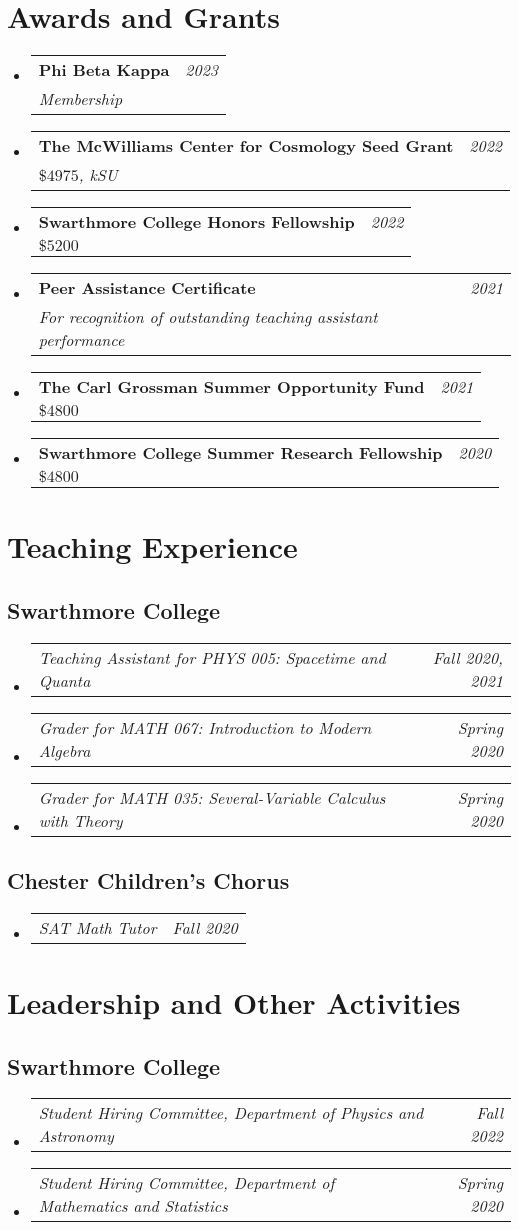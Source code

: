 \documentclass[letterpaper,11pt]{article}
\makeatletter
\newcommand{\resumeSubSubheading}[2]{
    \vspace{-8pt}\item
    \begin{tabular*}{0.97\textwidth}{l@{\extracolsep{\fill}}r}
      \textit{\small#1} & \textit{\small #2} \\
    \end{tabular*}\vspace{-10pt}
}
\newcommand{\AwardHeading}[4]{
    \vspace{-2pt}\item
    \begin{tabular*}{0.97\textwidth}{l@{\extracolsep{\fill}}r}
      \textbf{#1} & \textit{\small #2} \\
      \textit{#3} & \textit{#4}
    \end{tabular*}\vspace{-4pt}
}
\newcommand{\resumeSubHeadingListStart}{\begin{itemize}[leftmargin=0.15in, label={}]}
\newcommand{\resumeSubHeadingListEnd}{\end{itemize}}
\makeatother
\begin{document}
\section{Awards and Grants}
\vspace{3pt}
  \resumeSubHeadingListStart
    \AwardHeading{Phi Beta Kappa}{2023}{Membership}{}
    \AwardHeading{The McWilliams Center for Cosmology Seed Grant}{2022}{$\$4975$, {\normalfont 250 kSU}}{}
    \AwardHeading{Swarthmore College Honors Fellowship}{2022}{$\$5200$}{}
    \AwardHeading{Peer Assistance Certificate}{2021}{For recognition of outstanding teaching assistant performance}{}
    \AwardHeading{The Carl Grossman Summer Opportunity Fund }{2021}{$\$4800$}{}
    \AwardHeading{Swarthmore College Summer Research Fellowship}{2020}{$\$4800$}{}
  \resumeSubHeadingListEnd

\section{Teaching Experience}
  \vspace{3pt}
\subsection*{Swarthmore College}
\resumeSubHeadingListStart
\resumeSubSubheading{Teaching Assistant for PHYS 005: Spacetime and Quanta}{Fall 2020, 2021}
\resumeSubSubheading{Grader for MATH 067: Introduction to Modern Algebra}{Spring 2020}
\resumeSubSubheading{Grader for MATH 035: Several-Variable Calculus with Theory}{Spring 2020}
\resumeSubHeadingListEnd
\subsection*{Chester Children's Chorus}
\resumeSubHeadingListStart
\resumeSubSubheading{SAT Math Tutor}{Fall 2020}
\resumeSubHeadingListEnd
\vspace{1pt}
\section{Leadership and Other Activities}
  \vspace{3pt}
\subsection*{Swarthmore College}
\resumeSubHeadingListStart
\resumeSubSubheading{Student Hiring Committee, Department of Physics and Astronomy}{Fall 2022}
\resumeSubSubheading{Student Hiring Committee, Department of Mathematics and Statistics}{Spring 2020}
\resumeSubHeadingListEnd
\end{document}
